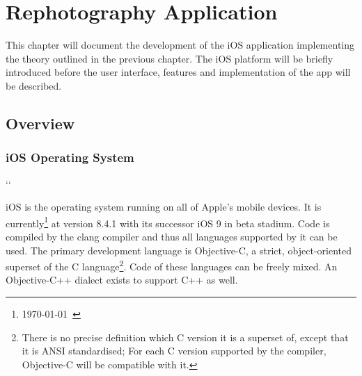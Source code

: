 \chapter{Rephotography Application}

This chapter will document the development of the iOS application implementing
the theory outlined in the previous chapter. The iOS platform will be briefly
introduced before the user interface, features and implementation of the app
will be described.

\section{Overview}


\subsection{iOS Operating System}

\newcommand*{\code}[1]{\begingroup\ttfamily\hyphenchar\font=23{#1}\endgroup}
\lccode`\:`\:

\setlength{\fboxsep}{0pt}
\newcommand*{\colorcode}[1]{\colorbox{gray!50}{\code{#1}\hspace{-6pt}}} %

iOS is the operating system running on all of Apple's mobile devices. It is
currently\footnote{\today\ \citep{ios8}} at version 8.4.1 with its successor iOS
9 in beta stadium. Code is compiled by the clang compiler and thus all
languages supported by it can be used. The primary development
language is Objective-C, a strict, object-oriented superset of the C language\footnote{There is
   no precise definition which C version it is a superset of, except that it is
   ANSI standardised; For each C version supported by the compiler, Objective-C
will be compatible with it.}. Code of these languages can be freely mixed. An
Objective-C++ dialect exists to support C++ as well.

